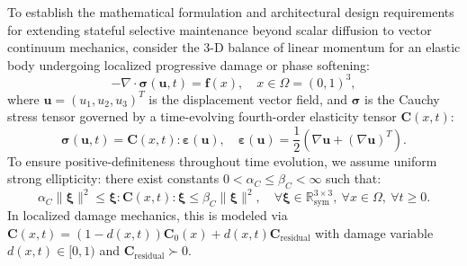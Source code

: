 To establish the mathematical formulation and architectural design requirements for extending stateful selective maintenance beyond scalar diffusion to vector continuum mechanics, consider the 3-D balance of linear momentum for an elastic body undergoing localized progressive damage or phase softening:
\begin{equation}
-\nabla \cdot \boldsymbol{\sigma}(\boldsymbol{u}, t) = \boldsymbol{f}(x), \quad x \in \Omega = (0, 1)^3,
\label{eq:elasticity_momentum}
\end{equation}
where $\boldsymbol{u} = (u_1, u_2, u_3)^T$ is the displacement vector field, and $\boldsymbol{\sigma}$ is the Cauchy stress tensor governed by a time-evolving fourth-order elasticity tensor $\mathbf{C}(x, t)$:
\begin{equation}
\boldsymbol{\sigma}(\boldsymbol{u}, t) = \mathbf{C}(x, t) : \boldsymbol{\varepsilon}(\boldsymbol{u}), \quad \boldsymbol{\varepsilon}(\boldsymbol{u}) = \frac{1}{2} \left( \nabla \boldsymbol{u} + (\nabla \boldsymbol{u})^T \right).
\end{equation}
To ensure positive-definiteness throughout time evolution, we assume uniform strong ellipticity: there exist constants $0 < \alpha_C \le \beta_C < \infty$ such that:
\begin{equation}
\alpha_C \|\boldsymbol{\xi}\|^2 \le \boldsymbol{\xi} : \mathbf{C}(x, t) : \boldsymbol{\xi} \le \beta_C \|\boldsymbol{\xi}\|^2, \quad \forall \boldsymbol{\xi} \in \mathbb{R}_{\text{sym}}^{3 \times 3}, \ \forall x \in \Omega, \ \forall t \ge 0.
\label{eq:strong_ellipticity}
\end{equation}
In localized damage mechanics, this is modeled via $\mathbf{C}(x, t) = (1 - d(x, t)) \mathbf{C}_0(x) + d(x, t) \mathbf{C}_{\text{residual}}$ with damage variable $d(x, t) \in [0, 1)$ and $\mathbf{C}_{\text{residual}} \succ 0$.

